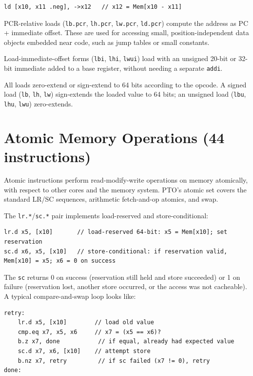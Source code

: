 \begin{lstlisting}[style=ptoscalarcode]
ld [x10, x11 .neg], ->x12   // x12 = Mem[x10 - x11]
\end{lstlisting}

PCR-relative loads (\texttt{lb.pcr}, \texttt{lh.pcr}, \texttt{lw.pcr}, \texttt{ld.pcr}) compute the address as PC + immediate offset. These are used for accessing small, position-independent data objects embedded near code, such as jump tables or small constants.

Load-immediate-offset forms (\texttt{lbi}, \texttt{lhi}, \texttt{lwui}) load with an unsigned 20-bit or 32-bit immediate added to a base register, without needing a separate \texttt{addi}.

All loads zero-extend or sign-extend to 64 bits according to the opcode. A signed load (\texttt{lb}, \texttt{lh}, \texttt{lw}) sign-extends the loaded value to 64 bits; an unsigned load (\texttt{lbu}, \texttt{lhu}, \texttt{lwu}) zero-extends.

\section{Atomic Memory Operations (44 instructions)}
Atomic instructions perform read-modify-write operations on memory atomically, with respect to other cores and the memory system. PTO's atomic set covers the standard LR/SC sequences, arithmetic fetch-and-op atomics, and swap.

The \texttt{lr.*}/\texttt{sc.*} pair implements load-reserved and store-conditional:

\begin{lstlisting}[style=ptoscalarcode]
lr.d x5, [x10]       // load-reserved 64-bit: x5 = Mem[x10]; set reservation
sc.d x6, x5, [x10]   // store-conditional: if reservation valid, Mem[x10] = x5; x6 = 0 on success
\end{lstlisting}

The \texttt{sc} returns 0 on success (reservation still held and store succeeded) or 1 on failure (reservation lost, another store occurred, or the access was not cacheable). A typical compare-and-swap loop looks like:

\begin{lstlisting}[style=ptoscalarcode]
retry:
    lr.d x5, [x10]        // load old value
    cmp.eq x7, x5, x6     // x7 = (x5 == x6)?
    b.z x7, done           // if equal, already had expected value
    sc.d x7, x6, [x10]    // attempt store
    b.nz x7, retry         // if sc failed (x7 != 0), retry
done:
\end{lstlisting}

